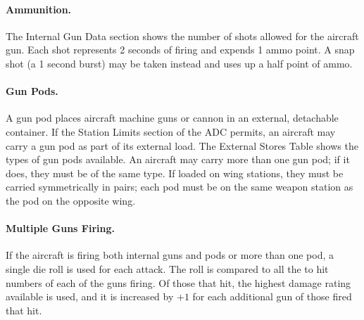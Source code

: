 \paragraph{Ammunition.} 
The Internal Gun Data section shows the number of shots allowed for the aircraft gun. Each shot represents 2 seconds of firing and expends 1 ammo point. A snap shot (a 1 second burst) may be taken instead and uses up a half point of ammo.

\paragraph{Gun Pods.} 
A gun pod places aircraft machine guns or cannon in an external, detachable container. If the Station Limits section of the ADC permits, an aircraft may carry a gun pod as part of its external load. The External Stores Table shows the types of gun pods available. An aircraft may carry more than one gun pod; if it does, they must be of the same type. If loaded on wing stations, they must be carried symmetrically in pairs; each pod must be on the same weapon station as the pod on the opposite wing.

\paragraph{Multiple Guns Firing.} 
If the aircraft is firing both internal guns and pods or more than one pod, a single die roll is used for each attack. The roll is compared to all the to hit numbers of each of the guns firing. Of those that hit, the highest damage rating available is used, and it is increased by $+1$ for each additional gun of those fired that hit.



